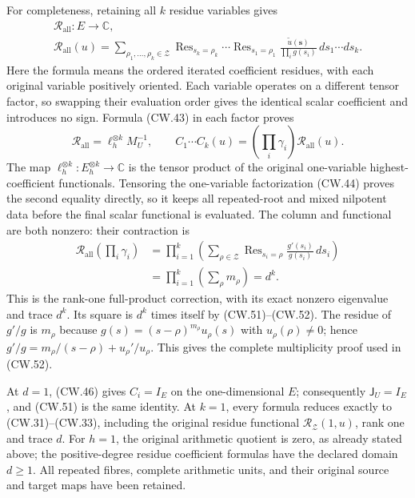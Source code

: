 For completeness, retaining all \(k\) residue variables gives
\[
 \begin{gathered}
 \mathcal R_{\mathrm{all}}:E\longrightarrow\mathbb C,\\
 \mathcal R_{\mathrm{all}}(u)=
 \sum_{\rho_1,\ldots,\rho_k\in\mathcal Z}
 \operatorname{Res}_{s_k=\rho_k}\cdots
 \operatorname{Res}_{s_1=\rho_1}
 \frac{\widetilde u(\mathbf s)}{\prod_i g(s_i)}\,
 ds_1\cdots ds_k .
 \end{gathered}                                                    \tag{CW.50}
\]
Here the formula means the ordered iterated coefficient
residues, with each original variable positively oriented.
Each variable operates on a different tensor factor, so
swapping their evaluation order gives the identical
scalar coefficient and introduces no sign.
Formula (CW.43) in each factor proves
\[
 \mathcal R_{\mathrm{all}}=\ell_h^{\otimes k}M_U^{-1},
 \qquad
 \boxed{C_1\cdots C_k(u)
 =\left(\prod_i\gamma_i\right)\mathcal R_{\mathrm{all}}(u).}
 \tag{CW.51}
\]
The map \(\ell_h^{\otimes k}:E_h^{\otimes k}\to\mathbb C\)
is the tensor product of the original one-variable
highest-coefficient functionals.
Tensoring the one-variable factorization (CW.44) proves
the second equality directly, so it keeps all repeated-root
and mixed nilpotent data before the final scalar
functional is evaluated.
The column and functional are both nonzero:
their contraction is
\[
 \begin{aligned}
 \mathcal R_{\mathrm{all}}\left(\prod_i\gamma_i\right)
 &=\prod_{i=1}^k
 \left(\sum_{\rho\in\mathcal Z}
 \operatorname{Res}_{s_i=\rho}\frac{g'(s_i)}{g(s_i)}\,ds_i\right)\\
 &=\prod_{i=1}^k\left(\sum_\rho m_\rho\right)=d^k .
 \end{aligned}                                                    \tag{CW.52}
\]
This is the rank-one full-product correction, with its
exact nonzero eigenvalue and trace \(d^k\).
Its square is \(d^k\) times itself by (CW.51)--(CW.52).
The residue of \(g'/g\) is \(m_\rho\) because
\(g(s)=(s-\rho)^{m_\rho}u_\rho(s)\) with
\(u_\rho(\rho)\ne0\); hence
\(g'/g=m_\rho/(s-\rho)+u_\rho'/u_\rho\).
This gives the complete multiplicity proof used in (CW.52).

At \(d=1\), (CW.46) gives \(C_i=I_E\) on the
one-dimensional \(E\); consequently \(\mathsf J_U=I_E\),
and (CW.51) is the same identity.
At \(k=1\), every formula reduces exactly to (CW.31)--(CW.33),
including the original residue functional
\(\mathscr R_{\mathcal Z}(1,u)\), rank one and trace \(d\).
For \(h=1\), the original arithmetic quotient is zero,
as already stated above; the positive-degree residue
coefficient formulas have the declared domain \(d\ge1\).
All repeated fibres, complete arithmetic units, and their
original source and target maps have been retained.
